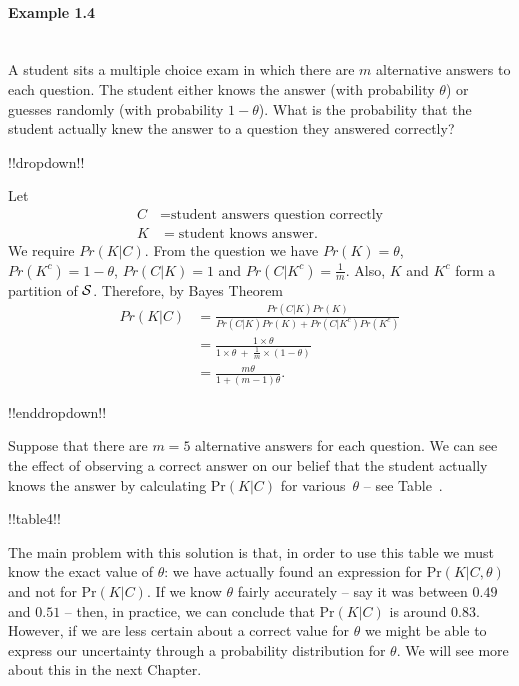 \paragraph{Example 1.4}{~\\
A student sits a multiple choice exam in which there are $m$
alternative answers to each question. The student either knows the
answer (with probability $\theta$) or guesses randomly (with
probability $1-\theta$). What is the probability that the student
actually knew the answer to a question they answered correctly?


!!dropdown!!

Let
        \begin{align*}
        C&=\text{student answers question correctly} \\
        K&=\text{student knows answer}.
        \end{align*}
        We require $Pr(K|C)$. From the question we have $Pr(K)=\theta$,
        $Pr(K^c)=1-\theta$, $Pr(C|K)=1$ and $Pr(C|K^c)=\frac{1}{m}$.  Also,
        $K$ and $K^c$ form a partition of ${\cal S}$. Therefore, by Bayes
        Theorem
        \begin{align*}
        Pr(K|C)&=\frac{Pr(C|K)Pr(K)}{Pr(C|K)Pr(K)+Pr(C|K^c)Pr(K^c)} \\
        &=\frac{1\times\theta}{1\times\theta~+~\frac{1}{m}\times(1-\theta)} \\
        &=\frac{m\theta}{1+(m-1)\theta}.
        \end{align*}

!!enddropdown!!

Suppose that there are $m=5$ alternative answers for each question. We
can see the effect of observing a correct answer on our belief
that the student actually knows the answer by calculating $\text{Pr}(K|C)$
for various~$\theta$ -- see Table~.}



!!table4!!

The main problem with this solution is that, in order to use this
table we must know the exact value of $\theta$: we have actually found
an expression for $\text{Pr}(K|C,\theta)$ and not for $\text{Pr}(K|C)$.  If we know
$\theta$ fairly accurately -- say it was between $0.49$ and $0.51$ --
then, in practice, we can conclude that $\text{Pr}(K|C)$ is around
0.83. However, if we are less certain about a correct value for
$\theta$ we might be able to express our uncertainty through a
probability distribution for $\theta$. We will see more about this in
the next Chapter.


